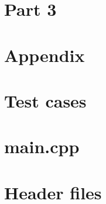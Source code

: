 \documentclass{article}
\begin{document}
\section*{Part 3}
\section*{Appendix}
\appendix
\section{Test cases}\label{appendix:test_main.cpp}

\section{main.cpp}\label{appendix:main.cpp}

\section{Header files}\label{appendix:headers}


%




\end{document}
